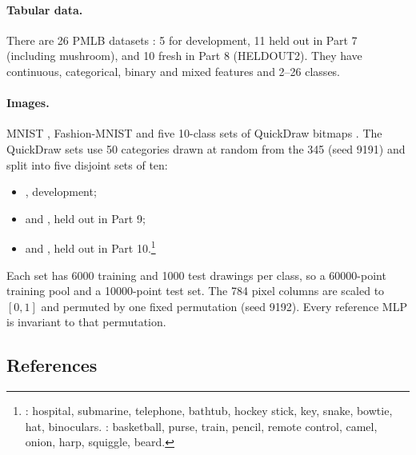 \paragraph{Tabular data.} There are 26 PMLB datasets \cite{olson2017pmlb}: 5 for development, 11 held out in Part 7 (including mushroom), and 10 fresh in Part 8 (HELDOUT2). They have continuous, categorical, binary and mixed features and 2--26 classes.

\paragraph{Images.} MNIST \cite{lecun1998mnist}, Fashion-MNIST \cite{xiao2017fashion} and five 10-class sets of QuickDraw bitmaps \cite{ha2017sketch}. The QuickDraw sets use 50 categories drawn at random from the 345 (seed 9191) and split into five disjoint sets of ten:
\begin{itemize}
\item {}, development;
\item {} and , held out in Part 9;
\item {} and , held out in Part 10.\footnote{: hospital, submarine, telephone, bathtub, hockey stick, key, snake, bowtie, hat, binoculars. : basketball, purse, train, pencil, remote control, camel, onion, harp, squiggle, beard.}
\end{itemize}
Each set has 6000 training and 1000 test drawings per class, so a 60000-point training pool and a 10000-point test set. The 784 pixel columns are scaled to $[0,1]$ and permuted by one fixed permutation (seed 9192). Every reference MLP is invariant to that permutation.

\subsection{References}\label{sec:refs}

